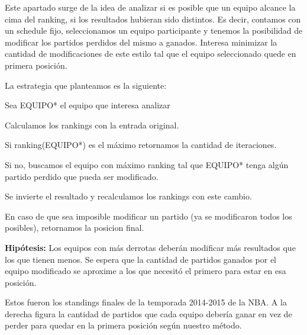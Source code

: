 Este apartado surge de la idea de analizar si es posible que un equipo alcance la cima del ranking, si los resultados hubieran sido distintos. Es decir, contamos con un schedule fijo, seleccionamos un equipo participante y tenemos la posibilidad de modificar los partidos perdidos del mismo a ganados. Interesa minimizar la cantidad de modificaciones de este estilo tal que el equipo seleccionado quede en primera posici\'on.

La estrategia que planteamos es la siguiente:

Sea EQUIPO* el equipo que interesa analizar

Calculamos los rankings con la entrada original.

Si ranking(EQUIPO*) es el m\'aximo retornamos la cantidad de iteraciones.

Si no, buscamos el equipo con m\'aximo ranking tal que EQUIPO* tenga alg\'un partido perdido que pueda ser modificado.

Se invierte el resultado y recalculamos los rankings con este cambio.

En caso de que sea imposible modificar un partido (ya se modificaron todos los posibles), retornamos la posicion final.

\textbf{Hip\'otesis:} Los equipos con m\'as derrotas deber\'an modificar m\'as resultados que los que tienen menos. Se espera que la cantidad de partidos ganados por el equipo modificado se aproxime a los que necesit\'o el primero para estar en esa posici\'on. 

Estos fueron los standings finales de la temporada 2014-2015 de la NBA. A la derecha figura la cantidad de partidos que cada equipo deber\'ia ganar en vez de perder para quedar en la primera posici\'on seg\'un nuestro m\'etodo. \\

